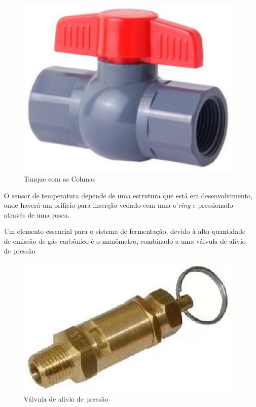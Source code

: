 \begin{figure}[h]
 \centering
 \includegraphics[keepaspectratio=true,scale=0.3]{figuras/valvula.eps}
 \caption{Tanque com as Colunas}
 \label{valvula}
\end{figure}

O sensor de temperatura depende de uma estrutura que está em desenvolvimento, onde haverá um orifício para inserção vedado com uma o’\textit{ring} e pressionado através de uma rosca.

Um elemento essencial para o sistema de fermentação, devido à alta quantidade de emissão de gás carbônico é o manômetro, combinado a uma válvula de alívio de pressão

\begin{figure}[h]
 \centering
 \includegraphics[keepaspectratio=true,scale=0.4]{figuras/manometro.eps}
 \caption{Válvula de alívio de pressão}
 \label{manometro}
\end{figure}

